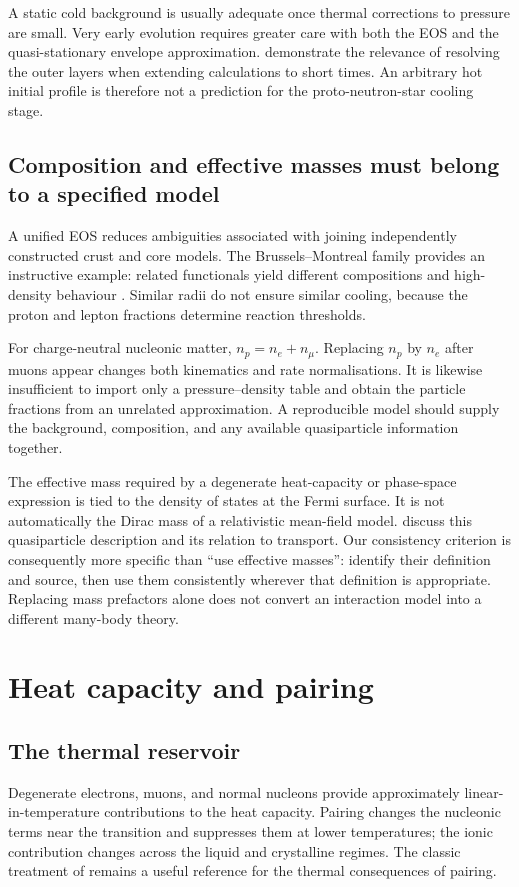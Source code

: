 \documentclass{aa}
\begin{document}
A static cold background is usually adequate once thermal corrections to pressure are small. Very early evolution requires greater care with both the EOS and the quasi-stationary envelope approximation. \citet{Potekhin2018} demonstrate the relevance of resolving the outer layers when extending calculations to short times. An arbitrary hot initial profile is therefore not a prediction for the proto-neutron-star cooling stage.

\subsection{Composition and effective masses must belong to a specified model}
A unified EOS reduces ambiguities associated with joining independently constructed crust and core models. The Brussels--Montreal family provides an instructive example: related functionals yield different compositions and high-density behaviour \citep{Pearson2018}. Similar radii do not ensure similar cooling, because the proton and lepton fractions determine reaction thresholds.

For charge-neutral nucleonic matter, $n_p=n_e+n_\mu$. Replacing $n_p$ by $n_e$ after muons appear changes both kinematics and rate normalisations. It is likewise insufficient to import only a pressure--density table and obtain the particle fractions from an unrelated approximation. A reproducible model should supply the background, composition, and any available quasiparticle information together.

The effective mass required by a degenerate heat-capacity or phase-space expression is tied to the density of states at the Fermi surface. It is not automatically the Dirac mass of a relativistic mean-field model. \citet{Schmitt2018} discuss this quasiparticle description and its relation to transport. Our consistency criterion is consequently more specific than ``use effective masses'': identify their definition and source, then use them consistently wherever that definition is appropriate. Replacing mass prefactors alone does not convert an interaction model into a different many-body theory.

\section{Heat capacity and pairing}
\subsection{The thermal reservoir}
Degenerate electrons, muons, and normal nucleons provide approximately linear-in-temperature contributions to the heat capacity. Pairing changes the nucleonic terms near the transition and suppresses them at lower temperatures; the ionic contribution changes across the liquid and crystalline regimes. The classic treatment of \citet{Yakovlev1999} remains a useful reference for the thermal consequences of pairing.
\end{document}
